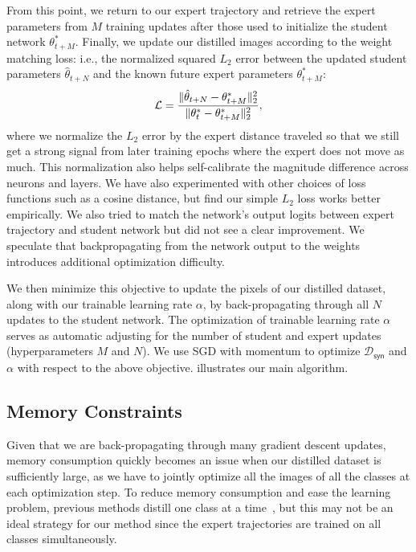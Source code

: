\documentclass[main.tex]{subfiles}
\begin{document}
From this point, we return to our expert trajectory and retrieve the expert parameters from $M$ training updates after those used to initialize the student network $\theta^*_{t+M}$. Finally, we update our distilled images according to the weight matching loss: i.e., the normalized squared $L_2$ error between the updated student parameters $\hat{\theta}_{t+N}$ and the known future expert parameters $\theta^*_{t+M}$:
\begin{equation}
    \mathcal{L} = \frac{\|\hat{\theta}_{t+N} - \theta^*_{t+M}\|^2_2}{\|\theta^*_{t} - \theta^*_{t+M}\|_2^2}, %
    \lbleq{weight_matching}
\end{equation}%
where we normalize the $L_2$ error by the expert distance traveled so that we still get a strong signal from later training epochs where the expert does not move as much. This normalization also helps self-calibrate the magnitude difference across neurons and layers. We have also experimented with other choices of loss functions such as a cosine distance, but find our simple $L_2$ loss works better empirically. We also tried to match the network's output logits between expert trajectory and student network but did not see a clear improvement. We speculate that backpropagating from the network output to the weights introduces additional optimization difficulty.  %


We then minimize this objective to update the pixels of our distilled dataset, along with our trainable learning rate $\alpha$, by back-propagating through all $N$ updates to the student network. The optimization of trainable learning rate $\alpha$ serves as automatic adjusting for the number of student and expert updates (hyperparameters $M$ and $N$).  We use SGD with momentum to optimize $\mathcal{D}_\mathsf{syn}$ and $\alpha$ with respect to the above objective.  illustrates our main algorithm. 


\subsection{Memory Constraints}
Given that we are back-propagating through many gradient descent updates, memory consumption quickly becomes an issue when our distilled dataset is sufficiently large, as we have to jointly optimize all the images of all the classes at each optimization step. To reduce memory consumption and ease the learning problem, previous methods distill one class at a time~\cite{dc, dsa, dm}, but this may not be an ideal strategy for our method since the expert trajectories are trained on all classes simultaneously.
\end{document}
